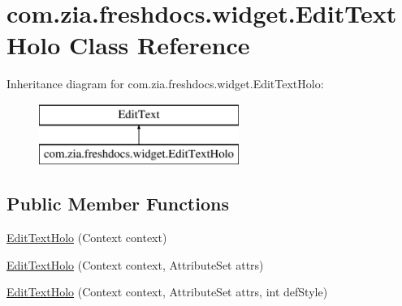 \hypertarget{classcom_1_1zia_1_1freshdocs_1_1widget_1_1_edit_text_holo}{\section{com.\-zia.\-freshdocs.\-widget.\-Edit\-Text\-Holo Class Reference}
\label{classcom_1_1zia_1_1freshdocs_1_1widget_1_1_edit_text_holo}
}
Inheritance diagram for com.\-zia.\-freshdocs.\-widget.\-Edit\-Text\-Holo\-:\begin{figure}[H]
\begin{center}
\leavevmode
\includegraphics[height=2.000000cm]{classcom_1_1zia_1_1freshdocs_1_1widget_1_1_edit_text_holo}
\end{center}
\end{figure}
\subsection*{Public Member Functions}
\begin{DoxyCompactItemize}
\item 
\hyperlink{classcom_1_1zia_1_1freshdocs_1_1widget_1_1_edit_text_holo_a2808a16a81b67c5aa563cb06ccfc1bdc}{Edit\-Text\-Holo} (Context context)
\item 
\hyperlink{classcom_1_1zia_1_1freshdocs_1_1widget_1_1_edit_text_holo_a370f76cbe33d2ad137fbd4f53f8b2e6c}{Edit\-Text\-Holo} (Context context, Attribute\-Set attrs)
\item 
\hyperlink{classcom_1_1zia_1_1freshdocs_1_1widget_1_1_edit_text_holo_a6896095a38c22ccc4c447565795cb41f}{Edit\-Text\-Holo} (Context context, Attribute\-Set attrs, int def\-Style)
\end{DoxyCompactItemize}


